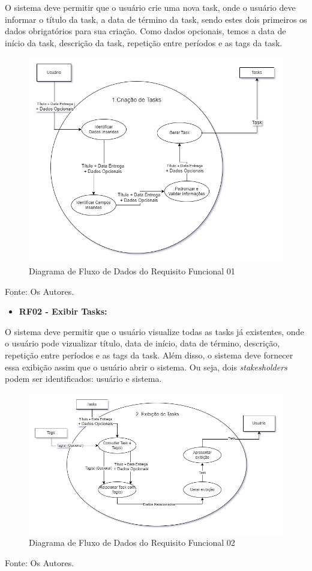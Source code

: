 \documentclass[a4paper,12pt]{article}
\begin{document}
O sistema deve permitir que o usuário crie uma nova task, onde o usuário deve informar o título da task, a data 
de término da task, sendo estes dois primeiros os dados obrigatórios para sua criação. Como dados opcionais, temos a 
data de início da task, descrição da task, repetição entre períodos e as tags da task.
\begin{figure}[H]
	\centering
	\includegraphics[scale=0.45]{DFDs/RF01.drawio.png}
	\caption{Diagrama de Fluxo de Dados do Requisito Funcional 01}
\end{figure}
\noindent Fonte: Os Autores.

\pagebreak
\begin{itemize}
\item\textbf{RF02 - Exibir Tasks:}
\end{itemize}

O sistema deve permitir que o usuário visualize todas as tasks já existentes, onde o usuário pode vizualizar 
título, data de início, data de término, descrição, repetição entre períodos e as tags da task. Além disso, o 
sistema deve fornecer essa exibição assim que o usuário abrir o sistema. Ou seja, dois \textit{stakesholders} 
podem ser identificados: usuário e sistema.
\begin{figure}[H]
	\centering
	\includegraphics[scale=0.45]{DFDs/RF02.drawio.png}
	\caption{Diagrama de Fluxo de Dados do Requisito Funcional 02}
\end{figure}
\noindent Fonte: Os Autores.
\end{document}
